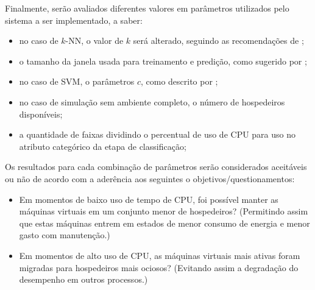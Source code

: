 Finalmente, serão avaliados diferentes valores em parâmetros utilizados
pelo sistema a ser implementado, a saber:

\begin{itemize}
  \item no caso de $k$-NN, o valor de $k$ será alterado, seguindo as
        recomendações de ;
   \item o tamanho da janela usada para treinamento e predição, como sugerido
        por ;
   \item no caso de SVM, o parâmetros $c$, como descrito por ;
   \item no caso de simulação sem ambiente completo, o número de hospedeiros disponíveis;
   \item a quantidade de faixas dividindo o percentual de uso de CPU para
         uso no atributo categórico da etapa de classificação;
\end{itemize}


Os resultados para cada combinação de parâmetros serão considerados
aceitáveis ou não de acordo com a aderência aos seguintes o
objetivos/questionamentos:
\begin{itemize}
  \item Em momentos de baixo uso de tempo de CPU, foi possível manter as
        máquinas virtuais em um conjunto menor de hospedeiros? (Permitindo
        assim que estas máquinas entrem em estados de menor consumo de
        energia e menor gasto com manutenção.)
  \item Em momentos de alto uso de CPU, as máquinas virtuais mais ativas
        foram migradas para hospedeiros mais ociosos? (Evitando assim a
        degradação do desempenho em outros processos.)
\end{itemize}
